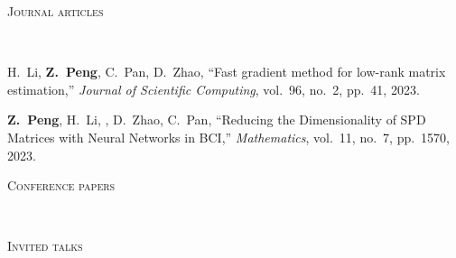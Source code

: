 \documentclass[a4paper, 10pt]{article}
\newenvironment{changemargin}[2]{%
  \begin{list}{}{%
    \setlength{\topsep}{0pt}%
    \setlength{\leftmargin}{#1}%
    \setlength{\rightmargin}{#2}%
    \setlength{\listparindent}{\parindent}%
    \setlength{\itemindent}{\parindent}%
    \setlength{\parsep}{\parskip}%
  }%
  \item[]}{\end{list}
}
\newcommand{\lineover}{
	\begin{changemargin}{-0.05in}{-0.05in}
		\vspace*{-8pt}
		\hrulefill \\
		\vspace*{-2pt}
	\end{changemargin}
}
\newcommand{\header}[1]{
	\begin{changemargin}{-0.5in}{-0.5in}
		\scshape{#1}\\
  	\lineover
	\end{changemargin}
}
\newenvironment{body} {
	\vspace*{-16pt}
	\begin{changemargin}{-0.3in}{-0.5in}
  }	
	{\end{changemargin}
}
\begin{document}
\bigskip
\header{\LARGE{Journal articles}}
\begin{body}
\vspace{18pt}
\begin{enumerate}[label={[{J}{{\arabic*}}]}]

\item H.~Li, \textbf{Z.~Peng}, C.~Pan, D.~Zhao, {``Fast gradient method for low-rank matrix estimation,''} \emph{Journal of Scientific Computing}, vol.~96, no.~2, pp.~41, 2023.\\

\item \textbf{Z.~Peng}, H.~Li, , D.~Zhao, C.~Pan, {``Reducing the Dimensionality of SPD Matrices with Neural Networks in BCI,''} \emph{Mathematics}, vol.~11, no.~7, pp.~1570, 2023.\\

 	
\end{enumerate}
\end{body}

\bigskip
\header{\LARGE{Conference papers}}
\begin{body}
	\vspace{18pt}
	\begin{enumerate}[label={[{C}{{\arabic*}}]}]
	\item
	\end{enumerate}
\end{body}



\bigskip
\header{\LARGE{Invited talks}}
\begin{body}
	\vspace{18pt}
	\begin{enumerate}[label={[{T}{{\arabic*}}]}]
	\item
	\end{enumerate}
\end{body}
\end{document}
